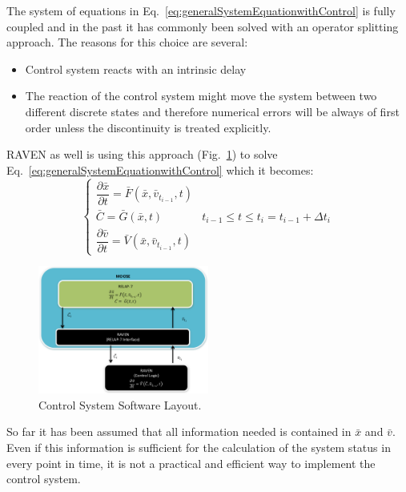 \documentclass{mc2013}
\begin{document}
\label{sec:operatorSplitting}

The system of equations in Eq.~\ref{eq:generalSystemEquationwithControl} is fully coupled and in the past it has commonly been solved with an operator splitting approach. The reasons for this choice are several:
\begin{itemize}
\item Control system reacts with an intrinsic delay
\item The reaction of the control system might move the system between two different discrete states and
therefore numerical errors will be always of first order unless the discontinuity is treated explicitly.
\end{itemize}
RAVEN as well is using this approach (Fig.~\ref{fig:ControlSoftwareLayout}) to solve Eq.~\ref{eq:generalSystemEquationwithControl} which it becomes:
\begin{equation}
\begin{cases} 
\dfrac{\partial \bar{x}}{\partial t} = \bar{F}(\bar{x},\bar{v}_{t_{i-1}},t) \\
\bar{C} = \bar{G}(\bar{x},t) & t_{i-1}\leq t\leq t_{i} = t_{i-1} + \Delta t_{i} \\ 
\dfrac{\partial \bar{v}}{\partial t} = \bar{V}(\bar{x},\bar{v}_{t_{i-1}},t) 
\end{cases}
\label{eq:generalSystemEquationwithControlSplitting}
\end{equation}
\begin{figure}[h] 
  \centering
     \includegraphics[width=0.5\textwidth]{figures/ControlSystemSoftwareLayout.pdf}
  \caption{Control System Software Layout.}
   \label{fig:ControlSoftwareLayout}
\end{figure}
\label{sec:auxiliary}
So far it has been assumed that all information needed is contained in $\bar{x}$ and $\bar{v}$. Even if this information is sufficient for the calculation of the system status in every point in time, it is not a practical and efficient way to implement the control system.
\end{document}
